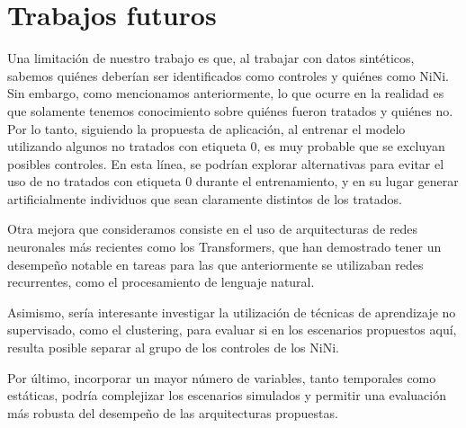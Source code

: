\documentclass[../main.tex]{subfiles}
\begin{document}
\section{Trabajos futuros}
Una limitación de nuestro trabajo es que, al trabajar con datos sintéticos, sabemos
quiénes deberían ser identificados como controles y quiénes como NiNi. Sin embargo, como
mencionamos anteriormente, lo que ocurre en la realidad es que solamente tenemos
conocimiento sobre quiénes fueron tratados y quiénes no. Por lo tanto, siguiendo la
propuesta de aplicación, al entrenar el modelo utilizando algunos no tratados con etiqueta
0, es muy probable que se excluyan posibles controles. En esta línea, se podrían explorar
alternativas para evitar el uso de no tratados con etiqueta 0 durante el entrenamiento, y
en su lugar generar artificialmente individuos que sean claramente distintos de los
tratados.

Otra mejora que consideramos consiste en el uso de arquitecturas de redes neuronales más
recientes como los Transformers, que han demostrado tener un desempeño notable en tareas
para las que anteriormente se utilizaban redes recurrentes, como el procesamiento de
lenguaje natural.

Asimismo, sería interesante investigar la utilización de técnicas de aprendizaje no
supervisado, como el clustering, para evaluar si en los escenarios propuestos aquí,
resulta posible separar al grupo de los controles de los NiNi.

Por último, incorporar un mayor número de variables, tanto temporales como estáticas,
podría complejizar los escenarios simulados y permitir una evaluación más robusta del
desempeño de las arquitecturas propuestas.
\end{document}
